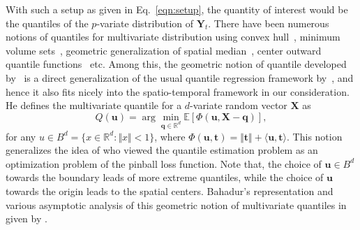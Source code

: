 \documentclass[11pt]{article}
\def\E{\mathbb{E}}
\def\R{\mathbb{R}}
\newcommand{\bb}[1]{\boldsymbol{#1}}
\theoremstyle{general}
\numberwithin{equation}{section}
\begin{document}
With such a setup as given in Eq.~\eqref{eqn:setup}, the quantity of interest would be the quantiles of the $p$-variate distribution of $\bb{Y}_t$. There have been numerous notions of quantiles for multivariate distribution using convex hull~\citep{eddy1985ordering}, minimum volume sets~\citep{einmahl1992generalized}, geometric generalization of spatial median~\citep{chaudhuri1996geometric}, center outward quantile functions~\citep{figalli2018continuity} etc. Among this, the geometric notion of quantile developed by~\cite{chaudhuri1996geometric} is a direct generalization of the usual quantile regression framework by~\cite{koenker1978regression}, and hence it also fits nicely into the spatio-temporal framework in our consideration. He defines the multivariate quantile for a $d$-variate random vector $\bb{X}$ as 
\begin{equation*}
    Q(\bb{u}) = \arg\min_{\bb{q} \in \R^d} \E\left[ \Phi(\bb{u}, \bb{X} - \bb{q}) \right],
\end{equation*}
\noindent for any $u \in B^d = \{ x \in \R^d : \Vert x \Vert < 1 \}$, where $\Phi(\bb{u}, \bb{t}) = \Vert \bb{t}\Vert + \langle \bb{u}, \bb{t}\rangle$. This notion generalizes the idea of \cite{koenker1978regression} who viewed the quantile estimation problem as an optimization problem of the pinball loss function. Note that, the choice of $\bb{u} \in B^d$ towards the boundary leads of more extreme quantiles, while the choice of $\bb{u}$ towards the origin leads to the spatial centers. Bahadur's representation and various asymptotic analysis of this geometric notion of multivariate quantiles in given by \cite{chaudhuri1996geometric}.
\end{document}
